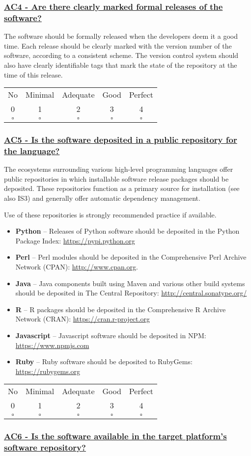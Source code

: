 \documentclass[a4paper,11pt]{article}
\newcommand{\criterion}[2]{\subsubsection*{\underline{#1 - #2}}\label{id:#1}}
\newcommand\CheckTable{%
  \begin{tabular}{ccccc}
    No & Minimal & Adequate & Good & Perfect \\
    0 & 1 & 2 & 3 & 4 \\
    \hline
    $\square$ & $\square$ & $\square$ & $\square$ & $\square$ \\
  \end{tabular}%
}
\begin{document}
\newcommand{\acFourID}{AC4}
\newcommand{\acFourText}{Are there clearly marked formal releases of the software?}
\criterion{\acFourID}{\acFourText}

The software should be formally released when the developers deem it a good
time. Each release should be clearly marked with the version number of the
software, according to a consistent scheme. The version control system should
also have clearly identifiable tags that mark the state of the repository at
the time of this release.

\CheckTable

\newcommand{\acFiveID}{AC5}
\newcommand{\acFiveText}{Is the software deposited in a public repository for the language?}
\criterion{\acFiveID}{\acFiveText}

The ecosystems surrounding various high-level programming languages offer
public repositories in which installable software release packages should be
deposited. These repositories function as a primary source for installation (see also
IS3) and generally offer automatic dependency management.

Use of these repositories is strongly recommended practice if available.

\begin{itemize}
    \item \textbf{Python} -- Releases of Python software should be deposited in
        the Python Package Index: \url{https://pypi.python.org}
    \item \textbf{Perl} --  Perl modules should be deposited in the Comprehensive
        Perl Archive Network (CPAN): \url{http://www.cpan.org}.
    \item \textbf{Java} -- Java components built using Maven and various other
        build systems should be deposited in The Central Repository: \url{http://central.sonatype.org/}
    \item \textbf{R} -- R packages should be deposited in the Comprehensive R
        Archive Network (CRAN): \url{https://cran.r-project.org}
    \item \textbf{Javascript} -- Javascript software should be deposited in
        NPM: \url{https://www.npmjs.com}
    \item \textbf{Ruby} -- Ruby software should be deposited to 
        RubyGems: \url{https://rubygems.org}
\end{itemize}

\CheckTable

\newcommand{\acSixID}{AC6}
\newcommand{\acSixText}{Is the software available in the target platform's software repository?}
\criterion{\acSixID}{\acSixText}
\end{document}
